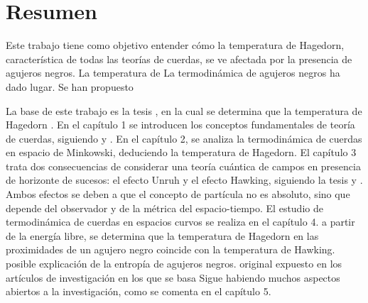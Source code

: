 \chapter*{Resumen}

Este trabajo tiene como objetivo entender cómo la temperatura de Hagedorn, 
característica de todas las teorías de cuerdas, se ve afectada por la presencia de agujeros
negros.
La temperatura de 
La termodinámica de agujeros negros ha  dado lugar.
Se han propuesto 

La base de este trabajo es la tesis \cite{Mertens2015}, en la cual se determina que la temperatura
de Hagedorn .
En el capítulo 1 se introducen los conceptos fundamentales de teoría de cuerdas, siguiendo \cite{Tong:2009np} y \cite{Mertens2015}. 
En el capítulo 2, se analiza la termodinámica de cuerdas en
espacio de Minkowski, deduciendo la temperatura de Hagedorn.
El capítulo 3 trata dos consecuencias de considerar una teoría cuántica de campos 
en presencia de horizonte de sucesos:  el efecto Unruh y el efecto Hawking, siguiendo la tesis \cite{Barbado:2015uua} y \cite{Sus}.
Ambos efectos se deben a que el concepto de partícula no es absoluto, sino que
depende del observador y de la métrica del espacio-tiempo.
El estudio de termodinámica de cuerdas en espacios curvos se realiza en el capítulo 4.
a partir de la energía libre, se determina que la temperatura de Hagedorn en las proximidades
de un agujero negro coincide con la temperatura de Hawking.
posible explicación de la entropía de agujeros negros.
original expuesto en los artículos de investigación en los que se basa \cite{Mertens2015} 
Sigue habiendo muchos aspectos abiertos a la investigación, como se comenta en el capítulo 5.
